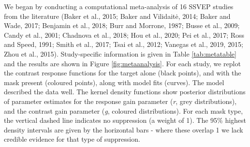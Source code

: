 \documentclass[]{article}
\begin{document}
We began by conducting a computational meta-analysis of 16 SSVEP studies from the literature (Baker et al., 2015; Baker and Vilidaitė, 2014; Baker and Wade, 2017; Benjamin et al., 2018; Burr and Morrone, 1987; Busse et al., 2009; Candy et al., 2001; Chadnova et al., 2018; Hou et al., 2020; Pei et al., 2017; Ross and Speed, 1991; Smith et al., 2017; Tsai et al., 2012; Vanegas et al., 2019, 2015; Zhou et al., 2015). Study-specific information is given in Table \ref{tab:metatable} and the results are shown in Figure \ref{fig:metaanalysis}. For each study, we replot the contrast response functions for the target alone (black points), and with the mask present (coloured points), along with model fits (curves). The model described the data well. The kernel density functions show posterior distributions of parameter estimates for the response gain parameter (\emph{r}, grey distributions), and the contrast gain parameter (\emph{g}, coloured distributions). For each mask type, the vertical dashed line indicates no suppression (a weight of 1). The 95\% highest density intervals are given by the horizontal bars - where these overlap 1 we lack credible evidence for that type of suppression.
\end{document}
